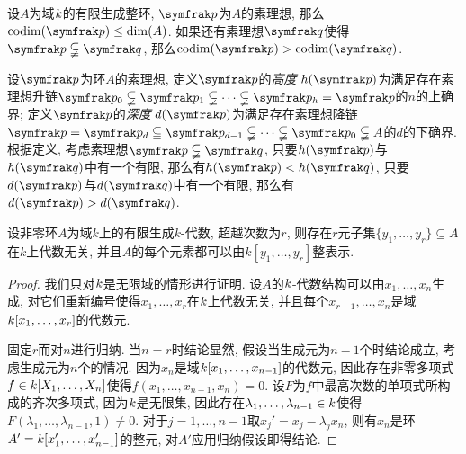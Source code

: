 \begin{propositionnoproof}\label{prop:primeidealdim}
  设$A$为域$k$的有限生成整环, $\ideal{p}$为$A$的素理想, 那么$\codim (\ideal{p})\leq\dim (A)$. 如果还有素理想$\ideal{q}$使得$\ideal{p}\subsetneqq\ideal{q}$, 那么$\codim (\ideal{p})>\codim (\ideal{q})$.
\end{propositionnoproof}

设$\ideal{p}$为环$A$的素理想,  定义$\ideal{p}$的\emph{高度} $h(\ideal{p})$为满足存在素理想升链$\ideal{p}_0\subsetneqq\ideal{p}_1\subsetneqq\dotsb\subsetneqq \ideal{p}_h=\ideal{p}$的$n$的上确界; 定义$\ideal{p}$的\emph{深度} $d(\ideal{p})$为满足存在素理想降链$\ideal{p}=\ideal{p}_d\subseteqq\ideal{p}_{d-1}\subsetneqq\dotsb\subsetneqq\ideal{p}_0\subsetneqq A$的$d$的下确界. 根据定义, 考虑素理想$\ideal{p}\subsetneqq\ideal{q}$, 只要$h(\ideal{p})$与$h(\ideal{q})$中有一个有限, 那么有$h(\ideal{p})<h(\ideal{q})$, 只要$d(\ideal{p})$与$d(\ideal{q})$中有一个有限, 那么有$d(\ideal{p})>d(\ideal{q})$.

\begin{proposition}\label{prop:noethernormalization}
  设非零环$A$为域$k$上的有限生成$k$-代数, 超越次数为$r$, 则存在$r$元子集$\{y_1, \dotsc, y_r\}\subseteq A$在$k$上代数无关, 并且$A$的每个元素都可以由$k[y_1, \dotsc, y_r]$整表示.
\end{proposition}

\begin{proof}
  我们只对$k$是无限域的情形进行证明. 设$A$的$k$-代数结构可以由$x_1, \dotsc, x_n$生成, 对它们重新编号使得$x_1, \dotsc, x_r$在$k$上代数无关, 并且每个$x_{r+1}, \dotsc, x_n$是域$k [x_1, \dotsc, x_r]$的代数元.

  固定$r$而对$n$进行归纳. 当$n=r$时结论显然, 假设当生成元为$n-1$个时结论成立, 考虑生成元为$n$个的情况. 因为$x_n$是域$k [x_1, \dotsc, x_{n-1}]$的代数元, 因此存在非零多项式$f\in k [X_1, \dotsc, X_n]$使得$f(x_1, \dotsc, x_{n-1}, x_n)=0$. 设$F$为$f$中最高次数的单项式所构成的齐次多项式, 因为$k$是无限集, 因此存在$\lambda_1, \dotsc, \lambda_{n-1}\in k$使得$F(\lambda_1, \dotsc, \lambda_{n-1}, 1)\neq 0$. 对于$j=1, \dotsc, n-1$取$x_j'=x_j-\lambda_jx_n$, 则有$x_n$是环$A'=k [x_1', \dotsc, x_{n-1}']$的整元, 对$A'$应用归纳假设即得结论.
\end{proof}


